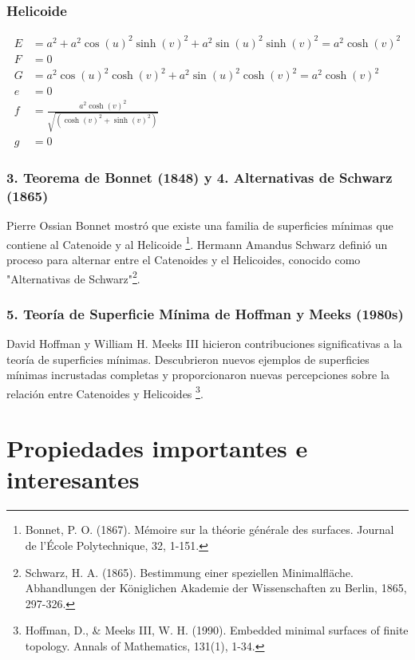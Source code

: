 \documentclass[10pt]{beamer}
\begin{document}
      \begin{frame}
        \frametitle{Helicoide}
        \begin{align*}
          E &= a^2 + a^2 \cos(u)^2 \sinh(v)^2 + a^2 \sin(u)^2 \sinh(v)^2= a^2\cosh (v)^2 \\
          F &= 0 \\
          G &= a^2 \cos(u)^2 \cosh(v)^2 + a^2 \sin(u)^2 \cosh(v)^2 = a^2\cosh (v)^2\\
          e &= 0 \\
          f &= \frac{a^2\cosh(v)^2}{\sqrt{(\cosh(v)^2 + \sinh(v)^2)}} \\
          g &= 0
          \end{align*}
      \end{frame}

        \begin{frame}
          \frametitle{3. Teorema de Bonnet (1848) y 4. Alternativas de Schwarz (1865)}
          Pierre Ossian Bonnet mostró que existe una familia de superficies mínimas que contiene al Catenoide y al Helicoide \footnote{Bonnet, P. O. (1867). Mémoire sur la théorie générale des surfaces. Journal de l’École Polytechnique, 32, 1-151.          }. Hermann Amandus Schwarz definió un proceso para alternar entre el Catenoides y el Helicoides, conocido como "Alternativas de Schwarz"\footnote{Schwarz, H. A. (1865). Bestimmung einer speziellen Minimalfläche. Abhandlungen der Königlichen Akademie der Wissenschaften zu Berlin, 1865, 297-326.}.
          
          \end{frame}

          \begin{frame}
            \frametitle{5. Teoría de Superficie Mínima de Hoffman y Meeks (1980s)}
            David Hoffman y William H. Meeks III hicieron contribuciones significativas a la teoría de superficies mínimas. Descubrieron nuevos ejemplos de superficies mínimas incrustadas completas y proporcionaron nuevas percepciones sobre la relación entre Catenoides y Helicoides \footnote{Hoffman, D., \& Meeks III, W. H. (1990). Embedded minimal surfaces of finite topology. Annals of Mathematics, 131(1), 1-34.}.
            \end{frame}

\section{Propiedades importantes e interesantes}
\end{document}
